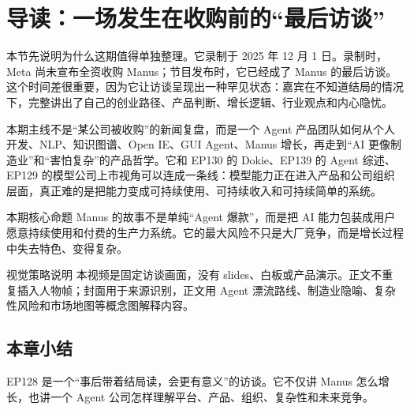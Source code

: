 \section{导读：一场发生在收购前的“最后访谈”}

本节先说明为什么这期值得单独整理。它录制于 2025 年 12 月 1 日。录制时，Meta 尚未宣布全资收购 Manus；节目发布时，它已经成了 Manus 的最后访谈。这个时间差很重要，因为它让访谈呈现出一种罕见状态：嘉宾在不知道结局的情况下，完整讲出了自己的创业路径、产品判断、增长逻辑、行业观点和内心隐忧。

本期主线不是“某公司被收购”的新闻复盘，而是一个 Agent 产品团队如何从个人开发、NLP、知识图谱、Open IE、GUI Agent、Manus 增长，再走到“AI 更像制造业”和“害怕复杂”的产品哲学。它和 EP130 的 Dokie、EP139 的 Agent 综述、EP129 的模型公司上市视角可以连成一条线：模型能力正在进入产品和公司组织层面，真正难的是把能力变成可持续使用、可持续收入和可持续简单的系统。

\begin{importantbox}{本期核心命题}
Manus 的故事不是单纯“Agent 爆款”，而是把 AI 能力包装成用户愿意持续使用和付费的生产力系统。它的最大风险不只是大厂竞争，而是增长过程中失去特色、变得复杂。
\end{importantbox}

\begin{knowledgebox}{视觉策略说明}
本视频是固定访谈画面，没有 slides、白板或产品演示。正文不重复插入人物帧；封面用于来源识别，正文用 Agent 漂流路线、制造业隐喻、复杂性风险和市场地图等概念图解释内容。
\end{knowledgebox}

\subsection{本章小结}

EP128 是一个“事后带着结局读，会更有意义”的访谈。它不仅讲 Manus 怎么增长，也讲一个 Agent 公司怎样理解平台、产品、组织、复杂性和未来竞争。

